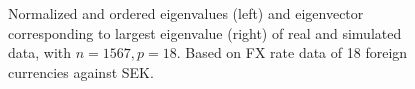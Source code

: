 \begin{figure}[ht]
\begin{minipage}{0.48\linewidth}
  \end{minipage}
  \caption{Normalized and ordered eigenvalues (left) and eigenvector
    corresponding to largest eigenvalue (right) of real and
    simulated data, with $n=1567, p=18$. Based on FX rate data of 18
    foreign currencies against SEK.}
  \label{eigen:data}
\end{figure}

